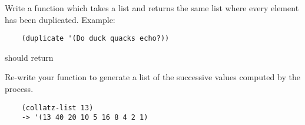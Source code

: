 \documentclass{../../../tp}
\begin{document}
\begin{instruction}	
	Write a function  which takes a list and returns the same list where every element has been duplicated. Example:
	
	\begin{verbatim}
	(duplicate '(Do duck quacks echo?))
	\end{verbatim}
	
	should return 
\end{instruction}


\begin{instruction}	
	Re-write your  function to generate a list of the successive values computed by the process. 
	
	\begin{verbatim}
	(collatz-list 13)
	-> '(13 40 20 10 5 16 8 4 2 1)
	\end{verbatim}
\end{instruction}
\end{document}
